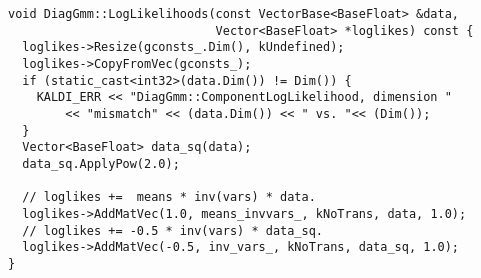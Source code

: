 \documentclass{article}
\begin{document}
\begin{verbatim}
void DiagGmm::LogLikelihoods(const VectorBase<BaseFloat> &data,
                             Vector<BaseFloat> *loglikes) const {
  loglikes->Resize(gconsts_.Dim(), kUndefined);
  loglikes->CopyFromVec(gconsts_);
  if (static_cast<int32>(data.Dim()) != Dim()) {
    KALDI_ERR << "DiagGmm::ComponentLogLikelihood, dimension "
        << "mismatch" << (data.Dim()) << " vs. "<< (Dim());
  }
  Vector<BaseFloat> data_sq(data);
  data_sq.ApplyPow(2.0);

  // loglikes +=  means * inv(vars) * data.
  loglikes->AddMatVec(1.0, means_invvars_, kNoTrans, data, 1.0);
  // loglikes += -0.5 * inv(vars) * data_sq.
  loglikes->AddMatVec(-0.5, inv_vars_, kNoTrans, data_sq, 1.0);
}
\end{verbatim}
\vspace{0.4in}
\end{document}
